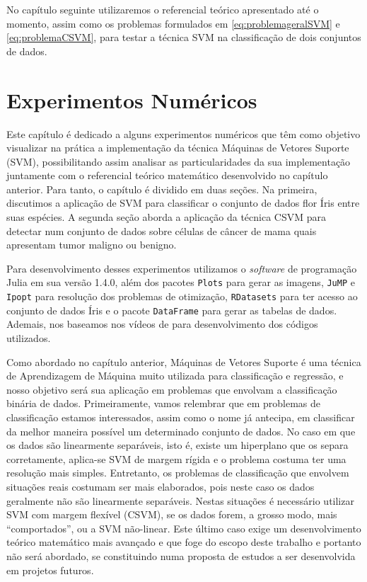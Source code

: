\documentclass[12pt,a4paper]{scrartcl}
\theoremstyle{definition}%
\begin{document}
No capítulo seguinte utilizaremos o referencial teórico apresentado até o momento, assim como os problemas formulados em \eqref{eq:problemageralSVM} e \eqref{eq:problemaCSVM}, para testar a técnica SVM na classificação de dois conjuntos de dados.

\newpage
\section{Experimentos Numéricos} \label{chap:experimentos_numericos}


Este capítulo é dedicado a alguns experimentos numéricos que têm como
objetivo visualizar na prática a implementação da técnica Máquinas de
Vetores Suporte (SVM), possibilitando assim analisar as particularidades
da sua implementação juntamente com o referencial teórico matemático
desenvolvido no capítulo anterior. Para tanto, o capítulo é dividido em
duas seções. Na primeira, discutimos a aplicação de SVM para classificar
o conjunto de dados flor Íris entre suas espécies. A segunda seção
aborda a aplicação da técnica CSVM para detectar num conjunto de dados
sobre células de câncer de mama quais apresentam tumor maligno ou
benigno.

Para desenvolvimento desses experimentos utilizamos o \emph{software} de
programação Julia em sua versão 1.4.0, além dos pacotes \texttt{Plots}
para gerar as imagens, \texttt{JuMP} e \texttt{Ipopt} para resolução dos
problemas de otimização, \texttt{RDatasets} para ter acesso ao conjunto
de dados Íris e o pacote \texttt{DataFrame} para gerar as tabelas de
dados. Ademais, nos baseamos nos vídeos de \textcite{AbelSVM1,AbelSVM2} para desenvolvimento dos códigos utilizados.

Como abordado no capítulo anterior, Máquinas de Vetores Suporte é uma
técnica de Aprendizagem de Máquina muito utilizada para classificação e
regressão, e nosso objetivo será sua aplicação em problemas que envolvam
a classificação binária de dados. Primeiramente, vamos relembrar que em
problemas de classificação estamos interessados, assim como o nome já
antecipa, em classificar da melhor maneira possível um determinado
conjunto de dados. No caso em que os dados são linearmente separáveis,
isto é, existe um hiperplano que os separa corretamente, aplica-se SVM
de margem rígida e o problema costuma ter uma resolução mais simples.
Entretanto, os problemas de classificação que envolvem situações reais
costumam ser mais elaborados, pois neste caso os dados geralmente não
são linearmente separáveis. Nestas situações é necessário utilizar SVM
com margem flexível (CSVM), se os dados forem, a grosso modo, mais
``comportados'', ou a SVM não-linear. Este último caso exige um
desenvolvimento teórico matemático mais avançado e que foge do escopo
deste trabalho e portanto não será abordado, se constituindo numa
proposta de estudos a ser desenvolvida em projetos futuros.
\end{document}
